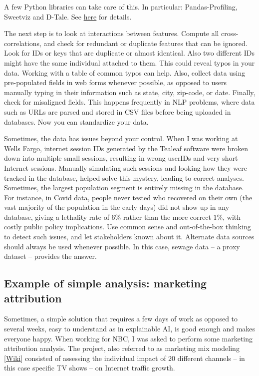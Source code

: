 \documentclass[oneside,10pt]{book}
\begin{document}
A few Python libraries can take care of this. In particular: Pandas-Profiling, Sweetviz and D-Tale. See \href{https://medium.com/@karteekmenda93/exploratory-data-analysis-tools-83ef538c879f}{here} for details. 

The next step is to look at interactions between features. Compute all cross-correlations, and check for redundant or duplicate features that can be ignored. Look for IDs or keys that are duplicate or almost identical. Also two different IDs might have the same individual attached to them. This could reveal typos in your data. Working with a table of common typos can help. Also, collect data using 
pre-populated fields in web forms whenever possible, as opposed to users manually typing in their information such as state, city, zip-code, or date. Finally, check for misaligned fields. This happens frequently in NLP problems, where data such as URLs are parsed and stored in CSV files before being uploaded in databases. Now you can standardize your data. 

Sometimes, the data has issues beyond your control. When I was working at Wells Fargo, internet session IDs generated by the Tealeaf software were broken down into multiple small sessions, resulting in 
 wrong userIDs and very short Internet sessions. Manually simulating such sessions and looking how they were tracked in the database, helped solve this mystery, leading to correct analyses. Sometimes, the largest population segment is entirely missing in the database. For instance, in Covid data, people never tested who recovered on their own (the vast majority of the population in the early days) did not show up in any database, giving a lethality rate of $6\%$ rather than the more correct $1\%$, with costly public policy implications. Use common sense and out-of-the-box thinking to detect such issues, and let stakeholders known about it. Alternate data sources should always be used whenever possible. In this case, sewage data -- a proxy dataset -- provides the answer.


\subsection{Example of simple analysis: marketing attribution}

Sometimes, a simple solution that requires a few days of work as opposed to several weeks, easy to understand as in explainable AI, is good enough and makes everyone happy. When working for NBC, I was asked to perform some \textcolor{index}{marketing attribution} analysis. The project, also referred to as marketing mix modeling [\href{https://en.wikipedia.org/wiki/Marketing_mix_modeling}{Wiki}] consisted of assessing the individual impact of $20$ different channels -- in this case specific TV shows -- on Internet traffic growth. 
\end{document}
